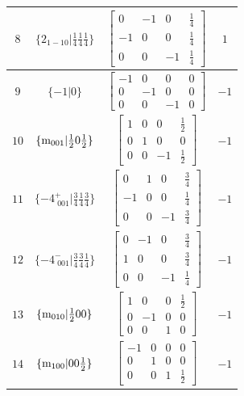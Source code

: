 \documentclass[fleqn,8pt]{jsarticle}
\begin{document}
\begin{longtable}{cccc}
$ 8 $ & $ \{2{}_{1-10}|\frac{1}{4} \frac{1}{4} \frac{1}{4}\} $ & $ \begin{bmatrix} 0 & -1 & 0 & \frac{1}{4} \\ -1 & 0 & 0 & \frac{1}{4} \\ 0 & 0 & -1 & \frac{1}{4} \end{bmatrix} $ & $ 1 $ \\ \hline
$ 9 $ & $ \{-1|0\} $ & $ \begin{bmatrix} -1 & 0 & 0 & 0 \\ 0 & -1 & 0 & 0 \\ 0 & 0 & -1 & 0 \end{bmatrix} $ & $ -1 $ \\ \hline
$ 10 $ & $ \{{\rm m}_{001}|\frac{1}{2} 0 \frac{1}{2}\} $ & $ \begin{bmatrix} 1 & 0 & 0 & \frac{1}{2} \\ 0 & 1 & 0 & 0 \\ 0 & 0 & -1 & \frac{1}{2} \end{bmatrix} $ & $ -1 $ \\ \hline
$ 11 $ & $ \{-4^{+}_{\,\,001}|\frac{3}{4} \frac{1}{4} \frac{3}{4}\} $ & $ \begin{bmatrix} 0 & 1 & 0 & \frac{3}{4} \\ -1 & 0 & 0 & \frac{1}{4} \\ 0 & 0 & -1 & \frac{3}{4} \end{bmatrix} $ & $ -1 $ \\ \hline
$ 12 $ & $ \{-4^{-}_{\,\,001}|\frac{3}{4} \frac{3}{4} \frac{1}{4}\} $ & $ \begin{bmatrix} 0 & -1 & 0 & \frac{3}{4} \\ 1 & 0 & 0 & \frac{3}{4} \\ 0 & 0 & -1 & \frac{1}{4} \end{bmatrix} $ & $ -1 $ \\ \hline
$ 13 $ & $ \{{\rm m}_{010}|\frac{1}{2} 0 0\} $ & $ \begin{bmatrix} 1 & 0 & 0 & \frac{1}{2} \\ 0 & -1 & 0 & 0 \\ 0 & 0 & 1 & 0 \end{bmatrix} $ & $ -1 $ \\ \hline
$ 14 $ & $ \{{\rm m}_{100}|0 0 \frac{1}{2}\} $ & $ \begin{bmatrix} -1 & 0 & 0 & 0 \\ 0 & 1 & 0 & 0 \\ 0 & 0 & 1 & \frac{1}{2} \end{bmatrix} $ & $ -1 $ \\ \hline

\end{longtable}
\end{document}
